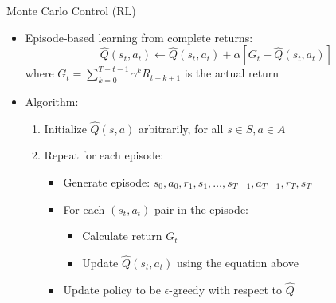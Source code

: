 \documentclass[10pt]{beamer}
\begin{document}
\begin{frame}{Monte Carlo Control (RL)}
    \begin{itemize}
        \item Episode-based learning from complete returns:
        \begin{equation}
            \hat{Q}(s_t,a_t) \leftarrow \hat{Q}(s_t,a_t) + \alpha \left[ G_t - \hat{Q}(s_t,a_t) \right]
        \end{equation}
        where $G_t = \sum_{k=0}^{T-t-1} \gamma^k R_{t+k+1}$ is the actual return
        
        \item Algorithm:
        \begin{enumerate}
            \item Initialize $\hat{Q}(s,a)$ arbitrarily, for all $s \in S, a \in A$
            \item Repeat for each episode:
            \begin{itemize}
                \item Generate episode: $s_0, a_0, r_1, s_1, \ldots, s_{T-1}, a_{T-1}, r_T, s_T$
                \item For each $(s_t,a_t)$ pair in the episode:
                \begin{itemize}
                    \item Calculate return $G_t$
                    \item Update $\hat{Q}(s_t,a_t)$ using the equation above
                \end{itemize}
                \item Update policy to be $\epsilon$-greedy with respect to $\hat{Q}$
            \end{itemize}
        \end{enumerate}
    \end{itemize}
\end{frame}
\end{document}
